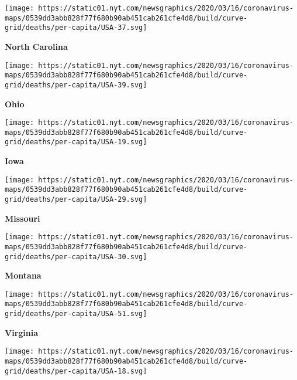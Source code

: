 \href{https://www.nytimes.com/interactive/2020/us/north-carolina-coronavirus-cases.html}{}

\texttt{[image: https://static01.nyt.com/newsgraphics/2020/03/16/coronavirus-maps/0539dd3abb828f77f680b90ab451cab261cfe4d8/build/curve-grid/deaths/per-capita/USA-37.svg]}

\textbf{North Carolina}

\href{https://www.nytimes.com/interactive/2020/us/ohio-coronavirus-cases.html}{}

\texttt{[image: https://static01.nyt.com/newsgraphics/2020/03/16/coronavirus-maps/0539dd3abb828f77f680b90ab451cab261cfe4d8/build/curve-grid/deaths/per-capita/USA-39.svg]}

\textbf{Ohio}

\href{https://www.nytimes.com/interactive/2020/us/iowa-coronavirus-cases.html}{}

\texttt{[image: https://static01.nyt.com/newsgraphics/2020/03/16/coronavirus-maps/0539dd3abb828f77f680b90ab451cab261cfe4d8/build/curve-grid/deaths/per-capita/USA-19.svg]}

\textbf{Iowa}

\href{https://www.nytimes.com/interactive/2020/us/missouri-coronavirus-cases.html}{}

\texttt{[image: https://static01.nyt.com/newsgraphics/2020/03/16/coronavirus-maps/0539dd3abb828f77f680b90ab451cab261cfe4d8/build/curve-grid/deaths/per-capita/USA-29.svg]}

\textbf{Missouri}

\href{https://www.nytimes.com/interactive/2020/us/montana-coronavirus-cases.html}{}

\texttt{[image: https://static01.nyt.com/newsgraphics/2020/03/16/coronavirus-maps/0539dd3abb828f77f680b90ab451cab261cfe4d8/build/curve-grid/deaths/per-capita/USA-30.svg]}

\textbf{Montana}

\href{https://www.nytimes.com/interactive/2020/us/virginia-coronavirus-cases.html}{}

\texttt{[image: https://static01.nyt.com/newsgraphics/2020/03/16/coronavirus-maps/0539dd3abb828f77f680b90ab451cab261cfe4d8/build/curve-grid/deaths/per-capita/USA-51.svg]}

\textbf{Virginia}

\href{https://www.nytimes.com/interactive/2020/us/indiana-coronavirus-cases.html}{}

\texttt{[image: https://static01.nyt.com/newsgraphics/2020/03/16/coronavirus-maps/0539dd3abb828f77f680b90ab451cab261cfe4d8/build/curve-grid/deaths/per-capita/USA-18.svg]}

